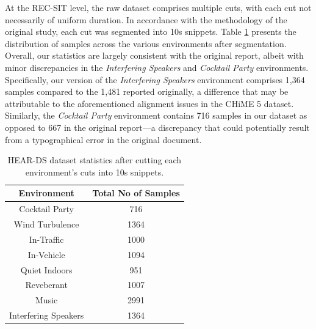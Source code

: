 \documentclass[logo,bsc,singlespacing,parskip,online]{infthesis}
\begin{document}
At the REC-SIT level, the raw dataset comprises multiple cuts, with each cut not necessarily of uniform duration.
In accordance with the methodology of the original study, each cut was segmented into 10s snippets.
Table \ref{tab:hear-ds-stats} presents the distribution of samples across the various environments after segmentation.
Overall, our statistics are largely consistent with the original report, albeit with minor discrepancies in the \textit{Interfering Speakers} and \textit{Cocktail Party} environments.
Specifically, our version of the \textit{Interfering Speakers} environment comprises 1,364 samples compared to the 1,481 reported originally, a difference that may be attributable to the aforementioned alignment issues in the CHiME 5 dataset.
Similarly, the \textit{Cocktail Party} environment contains 716 samples in our dataset as opposed to 667 in the original report—a discrepancy that could potentially result from a typographical error in the original document. 

\begin{table}[h]
   \centering
   \begin{tabular}{|c|c|}
      \hline
      Environment & Total No of Samples \\
      \hline
      Cocktail Party & 716 \\
      Wind Turbulence & 1364 \\
      In-Traffic & 1000 \\ 
      In-Vehicle & 1094 \\
      Quiet Indoors & 951 \\ 
      Reveberant & 1007 \\ 
      Music & 2991 \\
      Interfering Speakers & 1364 \\
      \hline
   \end{tabular}
   \caption{HEAR-DS dataset statistics after cutting each environment's cuts into 10s snippets.}
   \label{tab:hear-ds-stats}
\end{table}
\end{document}
